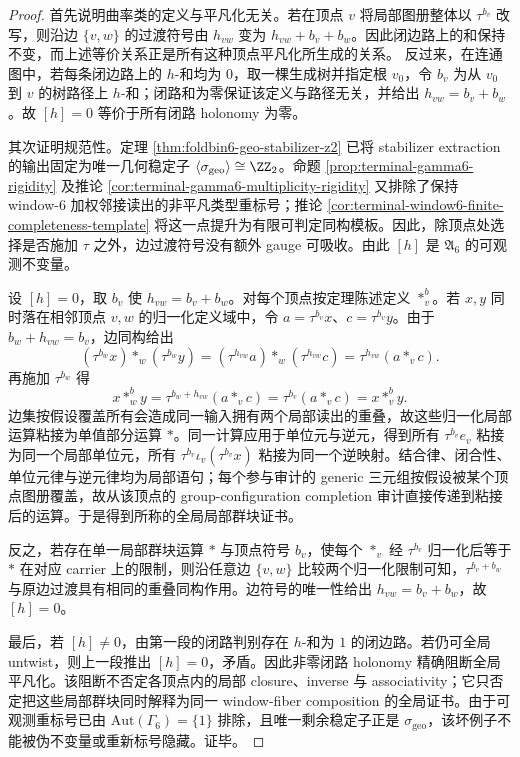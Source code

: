 \begin{proof}
首先说明曲率类的定义与平凡化无关。若在顶点 \(v\) 将局部图册整体以 \(\tau^{b_v}\) 改写，则沿边 \(\{v,w\}\) 的过渡符号由 \(h_{vw}\) 变为
\(h_{vw}+b_v+b_w\)。因此闭边路上的和保持不变，而上述等价关系正是所有这种顶点平凡化所生成的关系。
反过来，在连通图中，若每条闭边路上的 \(h\)-和均为 \(0\)，取一棵生成树并指定根 \(v_0\)，令 \(b_v\) 为从 \(v_0\) 到 \(v\) 的树路径上 \(h\)-和；闭路和为零保证该定义与路径无关，并给出 \(h_{vw}=b_v+b_w\)。故 \([h]=0\) 等价于所有闭路 holonomy 为零。

其次证明规范性。定理 \ref{thm:foldbin6-geo-stabilizer-z2} 已将 stabilizer extraction 的输出固定为唯一几何稳定子
\(\langle\sigma_{\mathrm{geo}}\rangle\cong\ZZ_2\)。命题 \ref{prop:terminal-gamma6-rigidity} 及推论 \ref{cor:terminal-gamma6-multiplicity-rigidity} 又排除了保持 window-\(6\) 加权邻接读出的非平凡类型重标号；推论 \ref{cor:terminal-window6-finite-completeness-template} 将这一点提升为有限可判定同构模板。因此，除顶点处选择是否施加 \(\tau\) 之外，边过渡符号没有额外 gauge 可吸收。由此 \([h]\) 是 \(\mathfrak A_6\) 的可观测不变量。

设 \([h]=0\)，取 \(b_v\) 使 \(h_{vw}=b_v+b_w\)。对每个顶点按定理陈述定义 \(*_v^b\)。若 \(x,y\) 同时落在相邻顶点 \(v,w\) 的归一化定义域中，令
\(a=\tau^{b_v}x\)、\(c=\tau^{b_v}y\)。由于 \(b_w+h_{vw}=b_v\)，边同构给出
\[
(\tau^{b_w}x)*_w(\tau^{b_w}y)
=(\tau^{h_{vw}}a)*_w(\tau^{h_{vw}}c)
=\tau^{h_{vw}}(a*_v c).
\]
再施加 \(\tau^{b_w}\) 得
\[
x*_w^b y
=\tau^{b_w+h_{vw}}(a*_v c)
=\tau^{b_v}(a*_v c)
=x*_v^b y.
\]
边集按假设覆盖所有会造成同一输入拥有两个局部读出的重叠，故这些归一化局部运算粘接为单值部分运算 \(*\)。同一计算应用于单位元与逆元，得到所有
\(\tau^{b_v}e_v\) 粘接为同一个局部单位元，所有 \(\tau^{b_v}\iota_v(\tau^{b_v}x)\) 粘接为同一个逆映射。结合律、闭合性、单位元律与逆元律均为局部语句；每个参与审计的 generic 三元组按假设被某个顶点图册覆盖，故从该顶点的 group-configuration completion 审计直接传递到粘接后的运算。于是得到所称的全局局部群块证书。

反之，若存在单一局部群块运算 \(*\) 与顶点符号 \(b_v\)，使每个 \(*_v\) 经 \(\tau^{b_v}\) 归一化后等于 \(*\) 在对应 carrier 上的限制，则沿任意边 \(\{v,w\}\) 比较两个归一化限制可知，\(\tau^{b_v+b_w}\) 与原边过渡具有相同的重叠同构作用。边符号的唯一性给出 \(h_{vw}=b_v+b_w\)，故 \([h]=0\)。

最后，若 \([h]\ne0\)，由第一段的闭路判别存在 \(h\)-和为 \(1\) 的闭边路。若仍可全局 untwist，则上一段推出 \([h]=0\)，矛盾。因此非零闭路 holonomy 精确阻断全局平凡化。该阻断不否定各顶点内的局部 closure、inverse 与 associativity；它只否定把这些局部群块同时解释为同一 window-fiber composition 的全局证书。由于可观测重标号已由 \(\mathrm{Aut}(\Gamma_6)=\{1\}\) 排除，且唯一剩余稳定子正是 \(\sigma_{\mathrm{geo}}\)，该坏例子不能被伪不变量或重新标号隐藏。证毕。
\end{proof}

